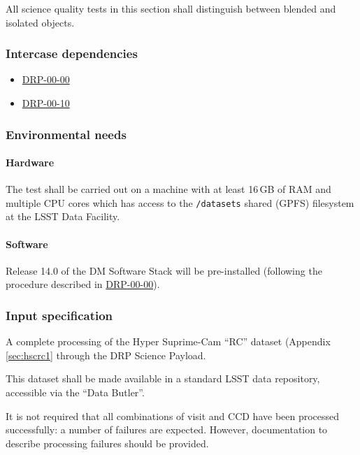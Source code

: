 All science quality tests in this section shall distinguish between blended and isolated objects.

\subsubsection{Intercase dependencies}

\begin{itemize}

  \item{\hyperref[drp-00-00]{DRP-00-00}}
  \item{\hyperref[drp-00-10]{DRP-00-10}}

\end{itemize}

\subsubsection{Environmental needs}

\paragraph{Hardware}

The test shall be carried out on a machine with at least 16\,GB of RAM and
multiple CPU cores which has access to the \texttt{/datasets} shared (GPFS)
filesystem at the LSST Data Facility.

\paragraph{Software}

Release 14.0 of the DM Software Stack will be pre-installed (following the
procedure described in \hyperref[drp-00-00]{DRP-00-00}).

\subsubsection{Input specification}

A complete processing of the Hyper Suprime-Cam ``RC'' dataset (Appendix
\ref{sec:hscrc1} through the DRP Science Payload.

This dataset shall be made available in a standard LSST data repository,
accessible via the ``Data Butler''.

It is not required that all combinations of visit and CCD have been processed
successfully: a number of failures are expected. However, documentation to
describe processing failures should be provided.

